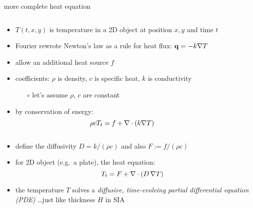 \begin{frame}{more complete heat equation}

\small
\begin{columns}
\begin{column}{0.6\textwidth}
\begin{itemize}
\item $T(t,x,y)$ is temperature in a 2D object at position $x,y$ and time $t$
\item Fourier rewrote Newton's law as a rule for heat flux: $\mathbf{q} = - k \nabla T$
\item allow an additional heat source $f$
\item coefficients: $\rho$ is density, $c$ is specific heat, $k$ is conductivity
  \begin{itemize}
  \item[$\circ$] let's assume $\rho$, $c$ are constant
  \end{itemize}
\item by conservation of energy:
	$$\rho c T_t = f + \nabla\cdot (k \nabla T)$$
\end{itemize}
\end{column}
\begin{column}{0.4\textwidth}
\end{column}
\end{columns}

\begin{itemize}
\item define the diffusivity $D=k/(\rho c)$ and also $F := f/(\rho c)$
\item for 2D object (e.g.~a plate), the heat equation:
\begin{equation}
T_t = F + \nabla\cdot (D\, \nabla T) \label{heat}
\end{equation}
\item the temperature $T$ solves a \emph{diffusive, time-evolving partial differential equation (PDE)} \dots just like thickness $H$ in SIA
\end{itemize}
\end{frame}


